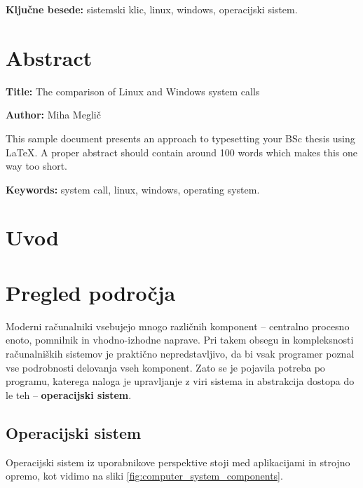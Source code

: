 \documentclass[a4paper,12pt,openright]{book}
\newcommand{\ttitleEn}{The comparison of Linux and Windows system calls}
\newcommand{\tauthor}{Miha Meglič}
\newcommand{\tkeywords}{sistemski klic, linux, windows, operacijski sistem}
\newcommand{\tkeywordsEn}{system call, linux, windows, operating system}
\newcommand{\clearemptydoublepage}{\newpage{\pagestyle{empty}\cleardoublepage}}
\begin{document}
\noindent\textbf{Ključne besede:} \tkeywords.
\clearemptydoublepage

\chapter*{Abstract}

\noindent\textbf{Title:} \ttitleEn
\bigskip

\noindent\textbf{Author:} \tauthor
\bigskip

\noindent This sample document presents an approach to typesetting your BSc thesis using \LaTeX. 
A proper abstract should contain around 100 words which makes this one way too short.
\bigskip

\noindent\textbf{Keywords:} \tkeywordsEn.
\clearemptydoublepage

\mainmatter
\setcounter{page}{1}
\pagestyle{fancy}

\chapter{Uvod}


\chapter{Pregled področja}

Moderni računalniki vsebujejo mnogo različnih komponent -- centralno procesno enoto, pomnilnik in vhodno-izhodne naprave.
Pri takem obsegu in kompleksnosti računalniških sistemov je praktično nepredstavljivo, da bi vsak programer poznal vse podrobnosti delovanja vseh komponent.
Zato se je pojavila potreba po programu, katerega naloga je upravljanje z viri sistema in abstrakcija dostopa do le teh -- \textbf{operacijski sistem}.

\section{Operacijski sistem}

Operacijski sistem iz uporabnikove perspektive stoji med aplikacijami in strojno opremo, kot vidimo na sliki \ref{fig:computer_system_components}.
\end{document}
